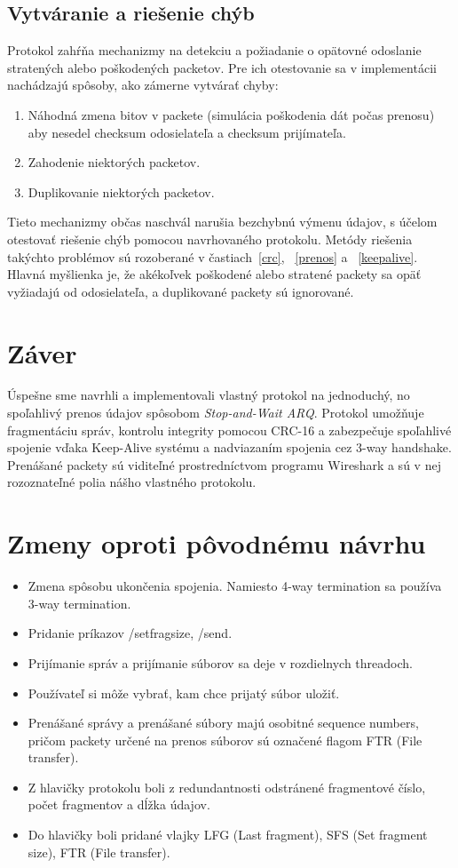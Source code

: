 \documentclass[a4paper,12pt]{article}
\begin{document}
    \subsection{Vytváranie a riešenie chýb}
    Protokol zahŕňa mechanizmy na detekciu a požiadanie o opätovné odoslanie stratených alebo poškodených packetov. Pre ich otestovanie sa v implementácii nachádzajú spôsoby, ako zámerne vytvárať chyby:
	\begin{enumerate}
		\item Náhodná zmena bitov v packete (simulácia poškodenia dát počas prenosu) aby nesedel checksum odosielateľa a checksum prijímateľa.
		\item Zahodenie niektorých packetov.
		\item Duplikovanie niektorých packetov. 
	\end{enumerate}

	Tieto mechanizmy občas naschvál narušia bezchybnú výmenu údajov, s účelom otestovať riešenie chýb pomocou navrhovaného protokolu. Metódy riešenia takýchto problémov sú rozoberané v častiach~\ref{crc}, ~\ref{prenos} a ~\ref{keepalive}. Hlavná myšlienka je, že akékoľvek poškodené alebo stratené packety sa opäť vyžiadajú od odosielateľa, a duplikované packety sú ignorované.


\section{Záver}
	Úspešne sme navrhli a implementovali vlastný protokol na jednoduchý, no spoľahlivý prenos údajov spôsobom \textit{Stop-and-Wait ARQ}. Protokol umožňuje fragmentáciu správ, kontrolu integrity pomocou CRC-16 a zabezpečuje spoľahlivé spojenie vďaka Keep-Alive systému a nadviazaním spojenia cez 3-way handshake. Prenášané packety sú viditeľné prostredníctvom programu Wireshark a sú v nej rozoznateľné polia nášho vlastného protokolu.

\section{Zmeny oproti pôvodnému návrhu}
	\begin{itemize}
	    \item Zmena spôsobu ukončenia spojenia. Namiesto 4-way termination sa používa 3-way termination.
	    \item Pridanie príkazov /setfragsize, /send.
	    \item Prijímanie správ a prijímanie súborov sa deje v rozdielnych threadoch.
	    \item Používateľ si môže vybrať, kam chce prijatý súbor uložiť.
	    \item Prenášané správy a prenášané súbory majú osobitné sequence numbers, pričom packety určené na prenos súborov sú označené flagom FTR (File transfer).
	    \item Z hlavičky protokolu boli z redundantnosti odstránené fragmentové číslo, počet fragmentov a dĺžka údajov.
            \item Do hlavičky boli pridané vlajky LFG (Last fragment), SFS (Set fragment size), FTR (File transfer).
	\end{itemize}
\end{document}

